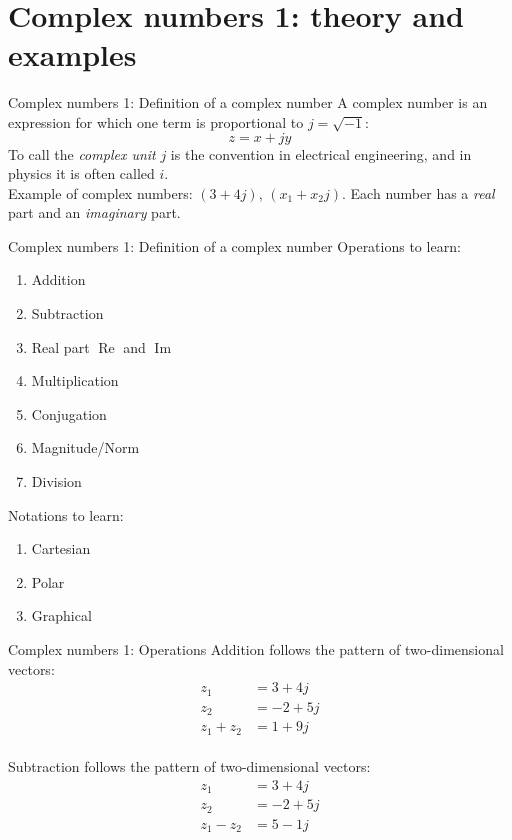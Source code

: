 \documentclass{beamer}
\begin{document}
\section{Complex numbers 1: theory and examples}

\begin{frame}{Complex numbers 1: Definition of a complex number}
A \alert{complex number} is an expression for which one term is proportional to $j = \sqrt{-1}$:
\begin{equation}
z = x + jy
\end{equation}
To call the \textit{complex unit} $j$ is the convention in electrical engineering, and in physics it is often called $i$. \\ \vspace{0.5cm}
Example of complex numbers: $(3+4j)$, $(x_1 + x_2 j)$.  Each number has a \textit{real} part and an \textit{imaginary} part.
\end{frame}

\begin{frame}{Complex numbers 1: Definition of a complex number}
Operations to learn:
\begin{enumerate}
\item Addition
\item Subtraction
\item Real part $\operatorname{Re}$ and $\operatorname{Im}$
\item Multiplication
\item Conjugation
\item Magnitude/Norm
\item Division
\end{enumerate}
Notations to learn:
\begin{enumerate}
\item Cartesian
\item Polar
\item Graphical
\end{enumerate}
\end{frame}

\begin{frame}{Complex numbers 1: Operations}
Addition follows the pattern of two-dimensional vectors:
\begin{align}
z_1 &= 3+4j \\
z_2 &= -2+5j \\
z_1 + z_2 &= 1+9j
\end{align} \\
Subtraction follows the pattern of two-dimensional vectors:
\begin{align}
z_1 &= 3+4j \\
z_2 &= -2+5j \\
z_1 - z_2 &= 5-1j
\end{align}
\end{frame}
\end{document}

